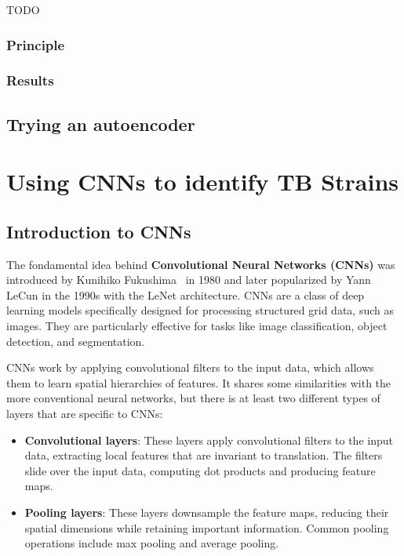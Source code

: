 TODO

\subsection{Principle}
\label{subsec:principle_dbscan_hdbscan}

\subsection{Results}
\label{subsec:results_dbscan_hdbscan}

\section{Trying an autoencoder}
\label{sec:autoencoder}

\chapter{Using CNNs to identify TB Strains}
\label{chap:cnn_tb_strains}

\section{Introduction to CNNs}
\label{sec:intro_cnn}

The fondamental idea behind \textbf{Convolutional Neural Networks (CNNs)} was introduced by Kunihiko Fukushima~\cite{Fukushima-1987}
in 1980 and later popularized by Yann LeCun in the 1990s with the LeNet architecture. CNNs are a class of deep learning 
models specifically designed for processing structured grid data, such as images.  They are particularly effective for tasks 
like image classification, object detection, and segmentation.

CNNs work by applying convolutional filters to the input data, which allows them to learn spatial hierarchies of features.
It shares some similarities with the more conventional neural networks, but there is at least two different types
of layers that are specific to CNNs:

\begin{itemize}
	\item \textbf{Convolutional layers}: These layers apply convolutional filters to the input data, extracting local features 
	that are invariant to translation. The filters slide over the input data, computing dot products and producing feature maps.
	\item \textbf{Pooling layers}: These layers downsample the feature maps, reducing their spatial dimensions while retaining important 
	information. Common pooling operations include max pooling and average pooling.
\end{itemize}

